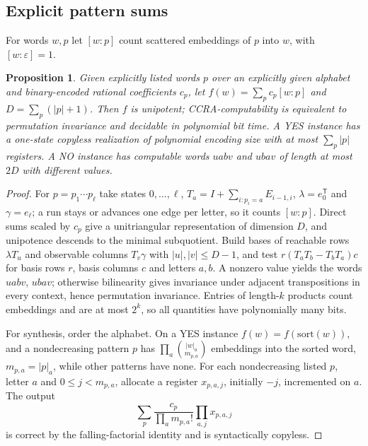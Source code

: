 \documentclass[11pt,letterpaper]{article}
\newcommand{\eps}{\varepsilon}
\newtheorem{proposition}[theorem]{Proposition}
\theoremstyle{definition}
\begin{document}
\subsection{Explicit pattern sums}
For words $w,p$ let $[w:p]$ count scattered embeddings of $p$ into $w$, with $[w:\eps]=1$.
\begin{proposition}\label{prop:patterns}
Given explicitly listed words $p$ over an explicitly given alphabet and binary-encoded rational coefficients $c_p$, let $f(w)=\sum_pc_p[w:p]$ and $D=\sum_p(|p|+1)$. Then $f$ is unipotent; CCRA-computability is equivalent to permutation invariance and decidable in polynomial bit time. A YES instance has a one-state copyless realization of polynomial encoding size with at most $\sum_p|p|$ registers. A NO instance has computable words $uabv$ and $ubav$ of length at most $2D$ with different values.
\end{proposition}
\begin{proof}
For $p=p_1\cdots p_\ell$ take states $0,\ldots,\ell$, $T_a=I+\sum_{i:p_i=a}E_{i-1,i}$, $\lambda=e_0^{\mathsf T}$ and $\gamma=e_\ell$; a run stays or advances one edge per letter, so it counts $[w:p]$. Direct sums scaled by $c_p$ give a unitriangular representation of dimension $D$, and unipotence descends to the minimal subquotient. Build bases of reachable rows $\lambda T_u$ and observable columns $T_v\gamma$ with $|u|,|v|\le D-1$, and test $r(T_aT_b-T_bT_a)c$ for basis rows $r$, basis columns $c$ and letters $a,b$. A nonzero value yields the words $uabv$, $ubav$; otherwise bilinearity gives invariance under adjacent transpositions in every context, hence permutation invariance. Entries of length-$k$ products count embeddings and are at most $2^k$, so all quantities have polynomially many bits.

For synthesis, order the alphabet. On a YES instance $f(w)=f(\mathrm{sort}(w))$, and a nondecreasing pattern $p$ has $\prod_a\binom{|w|_a}{m_{p,a}}$ embeddings into the sorted word, $m_{p,a}=|p|_a$, while other patterns have none. For each nondecreasing listed $p$, letter $a$ and $0\le j<m_{p,a}$, allocate a register $x_{p,a,j}$, initially $-j$, incremented on $a$. The output
\[\sum_p\frac{c_p}{\prod_am_{p,a}!}\prod_{a,j}x_{p,a,j}\]
is correct by the falling-factorial identity and is syntactically copyless.
\end{proof}




\end{document}
